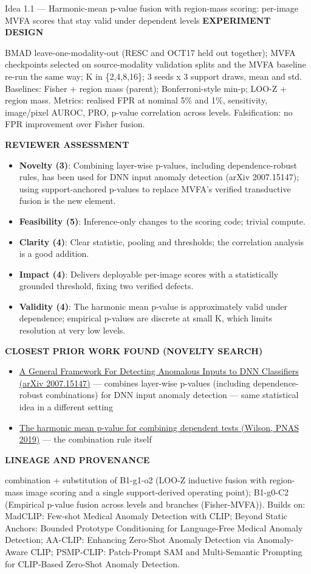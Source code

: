 \documentclass[11pt,a4paper]{article}
\newcommand{\lbl}[1]{{\sffamily\footnotesize\bfseries\color{muted}\MakeUppercase{#1}}\par}
\begin{document}
\begin{ideabox}{Idea 1.1 — Harmonic-mean p-value fusion with region-mass scoring: per-image MVFA scores that stay valid under dependent levels}
\lbl{Experiment design}BMAD leave-one-modality-out (RESC and OCT17 held out together); MVFA checkpoints selected on source-modality validation splits and the MVFA baseline re-run the same way; K in \{2,4,8,16\}; 3 seeds x 3 support draws, mean and std. Baselines: Fisher + region mass (parent); Bonferroni-style min-p; LOO-Z + region mass. Metrics: realised FPR at nominal 5\% and 1\%, sensitivity, image/pixel AUROC, PRO, p-value correlation across levels. Falsification: no FPR improvement over Fisher fusion.

\lbl{Reviewer assessment}\begin{itemize}[leftmargin=1.2em,itemsep=1pt,topsep=2pt]
\item \textbf{Novelty (3)}: Combining layer-wise p-values, including dependence-robust rules, has been used for DNN input anomaly detection (arXiv 2007.15147); using support-anchored p-values to replace MVFA's verified transductive fusion is the new element.
\item \textbf{Feasibility (5)}: Inference-only changes to the scoring code; trivial compute.
\item \textbf{Clarity (4)}: Clear statistic, pooling and thresholds; the correlation analysis is a good addition.
\item \textbf{Impact (4)}: Delivers deployable per-image scores with a statistically grounded threshold, fixing two verified defects.
\item \textbf{Validity (4)}: The harmonic mean p-value is approximately valid under dependence; empirical p-values are discrete at small K, which limits resolution at very low levels.
\end{itemize}
\lbl{Closest prior work found (novelty search)}\begin{itemize}[leftmargin=1.2em,itemsep=1pt,topsep=2pt]
\item \href{https://arxiv.org/pdf/2007.15147}{A General Framework For Detecting Anomalous Inputs to DNN Classifiers (arXiv 2007.15147)} — combines layer-wise p-values (including dependence-robust combinations) for DNN input anomaly detection — same statistical idea in a different setting
\item \href{https://www.danielwilson.me.uk/abstracts/wilson_2019.html}{The harmonic mean p-value for combining dependent tests (Wilson, PNAS 2019)} — the combination rule itself
\end{itemize}
\lbl{Lineage and provenance}{\small combination + substitution of B1-g1-o2 (LOO-Z inductive fusion with region-mass image scoring and a single support-derived operating point); B1-g0-C2 (Empirical p-value fusion across levels and branches (Fisher-MVFA)). Builds on: MadCLIP: Few-shot Medical Anomaly Detection with CLIP; Beyond Static Anchors: Bounded Prototype Conditioning for Language-Free Medical Anomaly Detection; AA-CLIP: Enhancing Zero-Shot Anomaly Detection via Anomaly-Aware CLIP; PSMP-CLIP: Patch-Prompt SAM and Multi-Semantic Prompting for CLIP-Based Zero-Shot Anomaly Detection.}
\end{ideabox}
\end{document}
